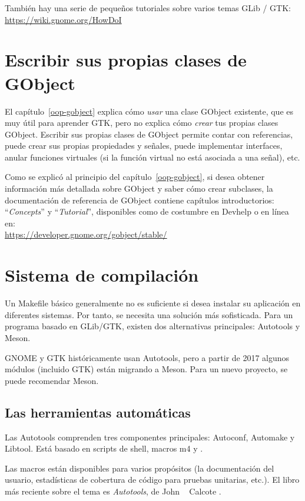También hay una serie de pequeños tutoriales sobre varios temas GLib / GTK: \\
\url{https://wiki.gnome.org/HowDoI}

\section{Escribir sus propias clases de GObject}

El capítulo~\ref{oop-gobject} explica cómo \emph{usar} una clase GObject existente, que es muy útil para aprender GTK, pero no explica cómo \emph{crear} tus propias clases GObject. Escribir sus propias clases de GObject permite contar con referencias, puede crear sus propias propiedades y señales, puede implementar interfaces, anular funciones virtuales (si la función virtual no está asociada a una señal), etc.

Como se explicó al principio del capítulo~\ref{oop-gobject}, si desea obtener información más detallada sobre GObject y saber cómo crear subclases, la documentación de referencia de GObject contiene capítulos introductorios: ``\emph{Concepts}'' y ``\emph{Tutorial}'', disponibles como de costumbre en Devhelp o en línea en: \\
\url{https://developer.gnome.org/gobject/stable/}

\section{Sistema de compilación}

Un Makefile básico generalmente no es suficiente si desea instalar su aplicación en diferentes sistemas. Por tanto, se necesita una solución más sofisticada. Para un programa basado en GLib/GTK, existen dos alternativas principales: Autotools y Meson.

GNOME y GTK históricamente usan Autotools, pero a partir de 2017 algunos módulos (incluido GTK) están migrando a Meson. Para un nuevo proyecto, se puede recomendar Meson.

\subsection{Las herramientas automáticas}

Las Autotools comprenden tres componentes principales: Autoconf, Automake y Libtool. Está basado en scripts de shell, macros m4 y .

Las macros están disponibles para varios propósitos (la documentación del usuario, estadísticas de cobertura de código para pruebas unitarias, etc.). El libro más reciente sobre el tema es \emph{Autotools}, de John ~ Calcote \cite{autotools}.

